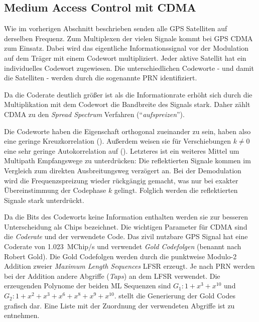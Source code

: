 \subsection{Medium Access Control mit CDMA}
\label{basics_cdma}
Wie im vorherigen Abschnitt beschrieben senden alle GPS Satelliten auf derselben Frequenz. Zum Multiplexen der vielen Signale kommt bei GPS \gls{CDMA} zum Einsatz. Dabei wird das eigentliche Informationssignal vor der Modulation auf dem Träger mit einem Codewort multipliziert. Jeder aktive Satellit hat ein individuelles Codewort zugewiesen. Die unterschiedlichen Codeworte - und damit die Satelliten - werden durch die sogenannte \gls{PRN} identifiziert.

Da die Coderate deutlich größer ist als die Informationrate erhöht sich durch die Multiplikation mit dem Codewort die Bandbreite des Signals stark. Daher zählt \gls{CDMA} zu den \emph{Spread Spectrum} Verfahren (\enquote{\emph{aufspreizen}}).

Die Codeworte haben die Eigenschaft orthogonal zueinander zu sein, haben also eine geringe Kreuzkorrelation (). Außerdem weisen sie für Verschiebungen $k\neq0$ eine sehr geringe Autokorrelation auf (). Letzteres ist ein weiteres Mittel um Multipath Empfangswege zu unterdrücken: Die reflektierten Signale kommen im Vergleich zum direkten Ausbreitungsweg verzögert an. Bei der Demodulation wird die Frequenzspreizung wieder rückgängig gemacht, was nur bei exakter Übereinstimmung der Codephase $k$ gelingt. Folglich werden die reflektierten Signale stark unterdrückt.



Da die Bits des Codeworts keine Information enthalten werden sie zur besseren Unterscheidung als \glspl{Chip} bezeichnet. Die wichtigen Parameter für CDMA sind die \emph{Coderate} und der verwendete Code. Das zivil nutzbare GPS Signal hat eine Coderate von \SI{1.023}{MChip/s} und verwendet \emph{Gold Codefolgen} (benannt nach Robert Gold). Die Gold Codefolgen werden durch die punktweise Modulo-2 Addition zweier \emph{Maximum Length Sequences} \gls{LFSR} erzeugt. Je nach \gls{PRN} werden bei der Addition andere Abgriffe (\emph{Taps}) an dem \gls{LFSR} verwendet. Die erzeugenden Polynome der beiden ML Sequenzen sind $G_1: 1 + x^3 + x^10$ und $G_2: 1 + x^2 + x^3 +x^6 + x^8 + x^9 + x^{10}$.  stellt die Generierung der Gold Codes grafisch dar. Eine Liste mit der Zuordnung der verwendeten Abgriffe ist \cite{specification2010gps} zu entnehmen.

